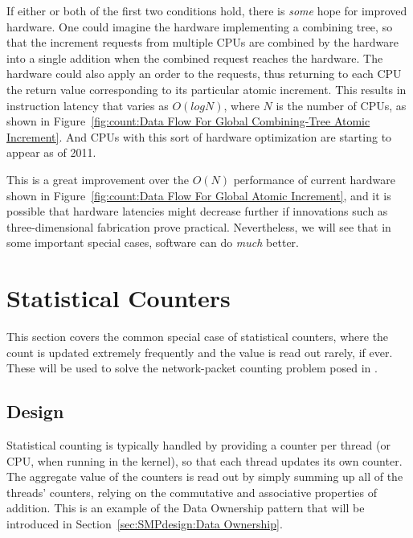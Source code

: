 {	If either or both of the first two conditions hold, there is
	\emph{some} hope for improved hardware.
	One could imagine the hardware implementing a combining tree,
	so that the increment requests from multiple CPUs are combined
	by the hardware into a single addition when the combined request
	reaches the hardware.
	The hardware could also apply an order to the requests, thus
	returning to each CPU the return value corresponding to its
	particular atomic increment.
	This results in instruction latency that varies as $O(log N)$,
	where $N$ is the number of CPUs, as shown in
	Figure~\ref{fig:count:Data Flow For Global Combining-Tree Atomic Increment}.
	And CPUs with this sort of hardware optimization are starting to
	appear as of 2011.

	This is a great improvement over the $O(N)$ performance
	of current hardware shown in
	Figure~\ref{fig:count:Data Flow For Global Atomic Increment},
	and it is possible that hardware latencies might decrease
	further if innovations such as three-dimensional fabrication prove
	practical.
	Nevertheless, we will see that in some important special cases,
	software can do \emph{much} better.
} \QuickQuizEnd

\section{Statistical Counters}
\label{sec:count:Statistical Counters}

This section covers the common special case of statistical counters, where
the count is updated extremely frequently and the value is read out
rarely, if ever.
These will be used to solve the network-packet counting problem
posed in {\QQstatcnt}.

\subsection{Design}

Statistical counting is typically handled by providing a counter per
thread (or CPU, when running in the kernel), so that each thread
updates its own counter.
The aggregate value of the counters is read out by simply summing up
all of the threads' counters,
relying on the commutative and associative properties of addition.
This is an example of the Data Ownership pattern that will be introduced in
Section~\ref{sec:SMPdesign:Data Ownership}.

